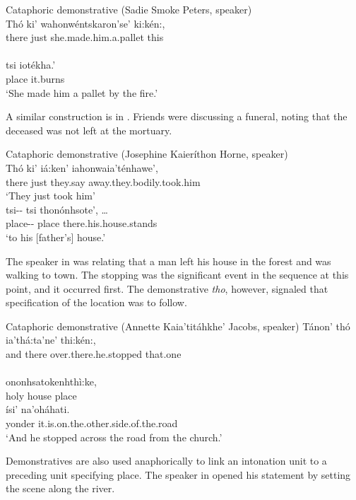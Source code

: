 \documentclass[output=paper,colorlinks,citecolor=brown]{langscibook}
\begin{document}
\ea \label{ex:mithun:8} Cataphoric demonstrative (Sadie Smoke Peters, speaker)\\
\gll Thó    ki' wahonwéntskaron'se'      ki:kén:,\\
     there  just  {she.made.him.a.pallet}  this  \\
\medskip\\
\gll tsi iotékha.'\\
place {it.burns}\\
\glt `She made him a pallet by the fire.'
\z

A similar construction is in . Friends were discussing a funeral, noting that the deceased was not left at the mortuary.

\ea\label{ex:mithun:9}Cataphoric demonstrative (Josephine Kaieríthon Horne, speaker)\\
\gll Thó ki' iá:ken' iahonwaia'ténhawe',\\
there {just} {they.say} {away.they.bodily.took.him}\\
\glt `They just took him'\medskip\\
\gll tsi-\/- tsi {thonónhsote',  \ldots }\\
     place-\/-  place {there.his.house.stands}\\
\glt `to his {[}father's{]} house.'
\z

The speaker in  was relating that a man left his house in the forest and was walking to town. The stopping was the significant event in the sequence at this point, and it occurred first. The demonstrative \emph{tho}, however, signaled that specification of the location was to follow.


\ea \label{ex:mithun:10}Cataphoric demonstrative (Annette Kaia'titáhkhe' Jacobs, speaker)
\gll Tánon' thó ia'thá:ta'ne'             thi:kén:,\\
     and  there  {over.there.he.stopped}  {that.one}\\
\medskip\\
ononhsatokenhthì:ke,\\
holy house place\medskip\\
\gll ísi' na'oháhati.\\
yonder {it.is.on.the.other.side.of.the.road}\\
\glt `And he stopped across the road from the church.'
\z

Demonstratives are also used anaphorically to link an intonation unit to a preceding unit specifying place. The speaker in  opened his statement by setting the scene along the river.
\end{document}
